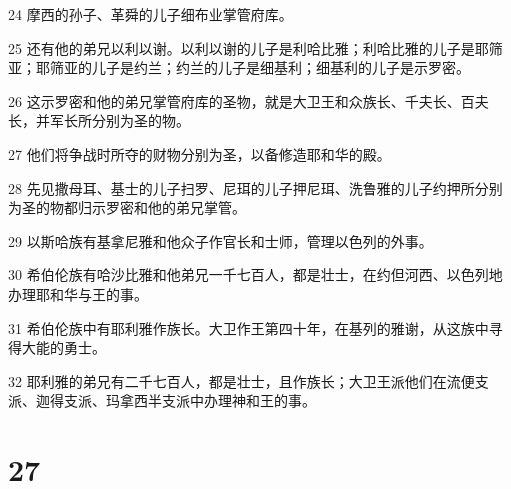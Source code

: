 \par 24 摩西的孙子、革舜的儿子细布业掌管府库。
\par 25 还有他的弟兄以利以谢。以利以谢的儿子是利哈比雅；利哈比雅的儿子是耶筛亚；耶筛亚的儿子是约兰；约兰的儿子是细基利；细基利的儿子是示罗密。
\par 26 这示罗密和他的弟兄掌管府库的圣物，就是大卫王和众族长、千夫长、百夫长，并军长所分别为圣的物。
\par 27 他们将争战时所夺的财物分别为圣，以备修造耶和华的殿。
\par 28 先见撒母耳、基士的儿子扫罗、尼珥的儿子押尼珥、洗鲁雅的儿子约押所分别为圣的物都归示罗密和他的弟兄掌管。
\par 29 以斯哈族有基拿尼雅和他众子作官长和士师，管理以色列的外事。
\par 30 希伯伦族有哈沙比雅和他弟兄一千七百人，都是壮士，在约但河西、以色列地办理耶和华与王的事。
\par 31 希伯伦族中有耶利雅作族长。大卫作王第四十年，在基列的雅谢，从这族中寻得大能的勇士。
\par 32 耶利雅的弟兄有二千七百人，都是壮士，且作族长；大卫王派他们在流便支派、迦得支派、玛拿西半支派中办理神和王的事。

\chapter{27}

